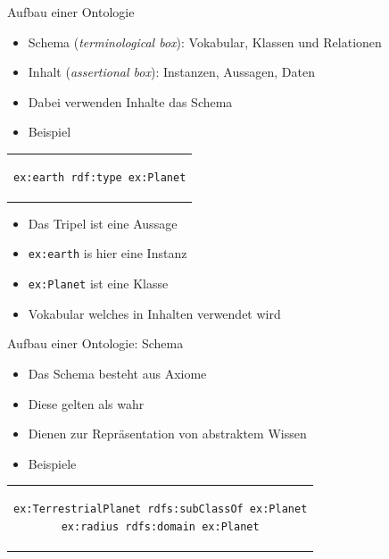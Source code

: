 \documentclass{beamer}
\begin{document}
\begin{frame}[fragile]{Aufbau einer Ontologie}

	\begin{itemize}
		\item Schema (\emph{terminological box}): Vokabular, Klassen und Relationen
		\item Inhalt (\emph{assertional box}): Instanzen, Aussagen, Daten 
		\item Dabei verwenden Inhalte das Schema
		\item Beispiel
	\end{itemize}	
	
    \begin{center}
    	\begin{tabular}{c}
    		\begin{lstlisting}
ex:earth rdf:type ex:Planet
    		\end{lstlisting}
    	\end{tabular}
    \end{center}
    
	\begin{itemize}
		\item Das Tripel ist eine Aussage
		\item \texttt{ex:earth} is hier eine Instanz
		\item \texttt{ex:Planet} ist eine Klasse
		\item Vokabular welches in Inhalten verwendet wird
	\end{itemize}	
	
\end{frame}

\begin{frame}[fragile]{Aufbau einer Ontologie: Schema}
	
	\begin{itemize}
		\item Das Schema besteht aus Axiome
		\item Diese gelten als wahr
		\item Dienen zur Repräsentation von abstraktem Wissen
		\item Beispiele
	\end{itemize}	
	
	\begin{center}
		\begin{tabular}{c}
			\begin{lstlisting}
ex:TerrestrialPlanet rdfs:subClassOf ex:Planet
ex:radius rdfs:domain ex:Planet
			\end{lstlisting}
		\end{tabular}
	\end{center}	
	
\end{frame}
\end{document}
